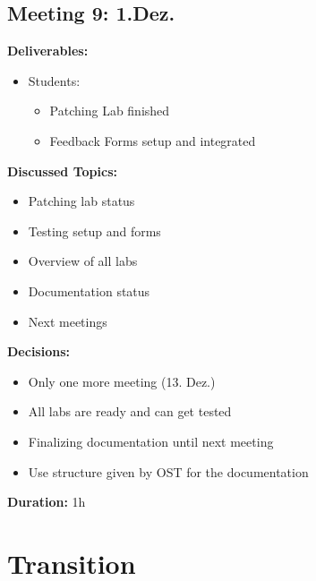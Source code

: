 \subsection*{Meeting 9: 1.Dez.}
\textbf{Deliverables:}
\begin{itemize}
    \item Students:
    \begin{itemize}
        \item Patching Lab finished 
        \item Feedback Forms setup and integrated
    \end{itemize}
\end{itemize} 
\textbf{Discussed Topics:}
\begin{itemize}
    \item Patching lab status 
    \item Testing setup and forms
    \item Overview of all labs
    \item Documentation status
    \item Next meetings
\end{itemize}
\textbf{Decisions:}
\begin{itemize}
    \item Only one more meeting (13. Dez.)
    \item All labs are ready and can get tested
    \item Finalizing documentation until next meeting
    \item Use structure given by OST for the documentation
\end{itemize}
\textbf{Duration:} 1h

\newpage
\section*{Transition}
